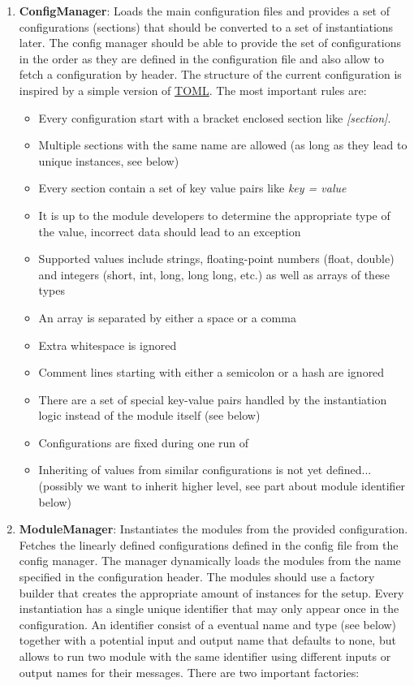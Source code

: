 \begin{enumerate}
\item \textbf{ConfigManager}: Loads the main configuration files and provides a set of configurations (sections) that should be converted to a set of instantiations later. The config manager should be able to provide the set of configurations in the order as they are defined in the configuration file and also allow to fetch a configuration by header. The structure of the current configuration is inspired by a simple version of \href{https://github.com/toml-lang/toml}{TOML}. The most important rules are:
\begin{itemize}
\item Every configuration start with a bracket enclosed section like \textit{[section]}.
\item Multiple sections with the same name are allowed (as long as they lead to unique instances, see below)
\item Every section contain a set of key value pairs like \textit{key = value}
\item It is up to the module developers to determine the appropriate type of the value, incorrect data should lead to an exception
\item Supported values include strings, floating-point numbers (float, double) and integers (short, int, long, long long, etc.) as well as arrays of these types
\item An array is separated by either a space or a comma
\item Extra whitespace is ignored
\item Comment lines starting with either a semicolon or a hash are ignored
\item There are a set of special key-value pairs handled by the instantiation logic instead of the module itself (see below)
\item Configurations are fixed during one run of \apsq
\item Inheriting of values from similar configurations is not yet defined... (possibly we want to inherit higher level, see part about module identifier below)
\end{itemize}
\item \textbf{ModuleManager}: Instantiates the modules from the provided configuration. Fetches the linearly defined configurations defined in the config file from the config manager. The manager dynamically loads the modules from the name specified in the configuration header. The modules should use a factory builder that creates the appropriate amount of instances for the setup. Every instantiation has a single unique identifier that may only appear once in the configuration. An identifier consist of a eventual name and type (see below) together with a potential input and output name that defaults to none, but allows to run two module with the same identifier using different inputs or output names for their messages. There are two important factories:

\end{enumerate}
